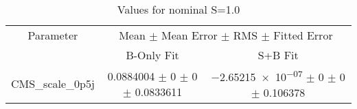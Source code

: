 \begin{table}
\centering
\caption{Values for nominal S=1.0}
\begin{tabular}{ccc}
\toprule
Parameter 	& \multicolumn{2}{c}{Mean $\pm$ Mean Error $\pm$ RMS $\pm$ Fitted Error}\\
 	& B-Only Fit & S+B Fit\\
\midrule
CMS\_scale\_0p5j 	& \num{0.0884004} $\pm$ \num{0} $\pm$ \num{0} $\pm$ \num{0.0833611} 	& \num{-2.65215e-07} $\pm$ \num{0} $\pm$ \num{0} $\pm$ \num{0.106378}\\
\bottomrule
\end{tabular}
\end{table}